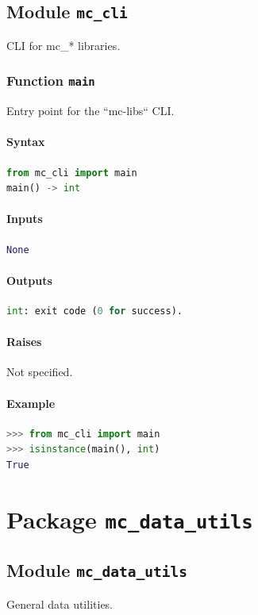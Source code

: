 \documentclass[11pt]{article}
\begin{document}
\subsection{Module \texttt{mc\_cli}}
CLI for mc\_* libraries.

\subsubsection{Function \texttt{main}}
Entry point for the ``mc-libs`` CLI.

\paragraph{Syntax}
\begin{lstlisting}[language=Python]
from mc_cli import main
main() -> int
\end{lstlisting}
\paragraph{Inputs}
\begin{lstlisting}[language=Python]
None
\end{lstlisting}
\paragraph{Outputs}
\begin{lstlisting}[language=Python]
int: exit code (0 for success).
\end{lstlisting}
\paragraph{Raises}
Not specified.
\paragraph{Example}
\begin{lstlisting}[language=Python]
>>> from mc_cli import main
>>> isinstance(main(), int)
True
\end{lstlisting}


\section{Package \texttt{mc\_data\_utils}}
\subsection{Module \texttt{mc\_data\_utils}}
General data utilities.
\end{document}
